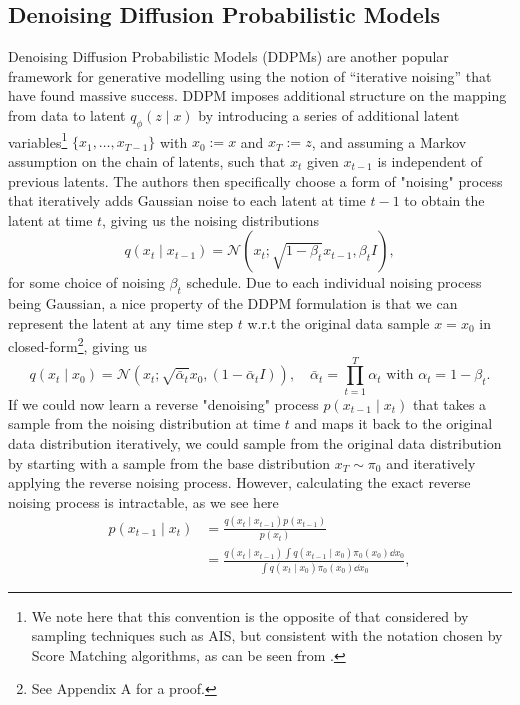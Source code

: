\subsection{Denoising Diffusion Probabilistic Models}
\label{sec:ddpm}

Denoising Diffusion Probabilistic Models (DDPMs) \parencite{ho2020denoising} are another popular framework for generative modelling using the notion of ``iterative noising'' that have found massive success. DDPM imposes additional structure on the mapping from data to latent $q_{\phi}(z \mid x)$ by introducing a series of additional latent variables\footnote{We note here that this convention is the opposite of that considered by sampling techniques such as AIS, but consistent with the notation chosen by Score Matching algorithms, as can be seen from .} $\{x_1, \ldots, x_{T-1}\}$ with $x_0 := x$ and $x_T := z$, and assuming a Markov assumption on the chain of latents, such that $x_t$ given $x_{t-1}$ is independent of previous latents. The authors then specifically choose a form of "noising" process that iteratively adds Gaussian noise to each latent at time $t-1$ to obtain the latent at time $t$, giving us the noising distributions
\begin{equation}
    q(x_t \mid x_{t-1}) = \mathcal{N}(x_t ; \sqrt{1 - \beta_t} x_{t-1}, \beta_t I), \label{eq:ddpm_noising}
\end{equation}
for some choice of noising $\beta_t$ schedule. \label{ntn:ddpm_noise}\label{ntn:ddpm_alpha}\label{ntn:ddpm_alpha_bar_ch2}Due to each individual noising process being Gaussian, a nice property of the DDPM formulation is that we can represent the latent at any time step $t$ w.r.t the original data sample $x = x_0$ in closed-form\footnote{See Appendix A for a proof.}, giving us
\begin{equation}
    q(x_t \mid x_0) = \mathcal{N}\left(x_t ; \sqrt{\bar{\alpha}_t} x_0, (1 - \bar{\alpha}_t I)\right), \quad \bar{\alpha}_t = \prod_{t=1}^T \alpha_t\text{ with } \alpha_t = 1 - \beta_t.
\end{equation}
If we could now learn a reverse "denoising" process $p(x_{t-1} \mid x_t)$ that takes a sample from the noising distribution at time $t$ and maps it back to the original data distribution iteratively, we could sample from the original data distribution by starting with a sample from the base distribution $x_T \sim \pi_0$ and iteratively applying the reverse noising process. However, calculating the exact reverse noising process is intractable, as we see here
\begin{align}
    p(x_{t-1} \mid x_t) &= \frac{q(x_t \mid x_{t-1}) p(x_{t-1})}{p(x_t)} \\
    &= \frac{q(x_t \mid x_{t-1}) \int q(x_{t-1} \mid x_0) \pi_0(x_0) \dd x_0}{\int q(x_t \mid x_0) \pi_0(x_0) \dd x_0},
\end{align}
